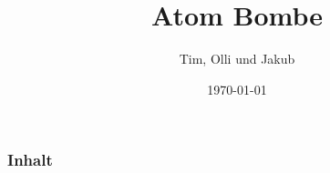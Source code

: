 \documentclass{beamer}
\title{Atom Bombe}
\author{Tim, Olli und Jakub}
\institute{Kanti Baden}
\date{\today}
\begin{document}
\begin{frame}
\titlepage
\end{frame}

\begin{frame}
\frametitle{Inhalt}
\end{frame}
\end{document}
